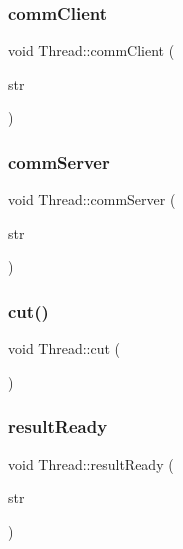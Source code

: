 \mbox{\label{class_thread_a263c49745ef39e51461339f482da6465}} 
\subsubsection{\texorpdfstring{comm\+Client}{commClient}}
{\footnotesize\ttfamily void Thread\+::comm\+Client (\begin{DoxyParamCaption}\item[{Q\+String}]{str }\end{DoxyParamCaption})\hspace{0.3cm}{\ttfamily [signal]}}

\mbox{\label{class_thread_a3a648f8e1ca34baf6a9c9ce98d51f498}} 
\subsubsection{\texorpdfstring{comm\+Server}{commServer}}
{\footnotesize\ttfamily void Thread\+::comm\+Server (\begin{DoxyParamCaption}\item[{Q\+String}]{str }\end{DoxyParamCaption})\hspace{0.3cm}{\ttfamily [signal]}}

\mbox{\label{class_thread_a01a6a634b4b993bf5ee53ccba4ad951d}} 
\subsubsection{\texorpdfstring{cut()}{cut()}}
{\footnotesize\ttfamily void Thread\+::cut (\begin{DoxyParamCaption}{ }\end{DoxyParamCaption})}

\mbox{\label{class_thread_aa850562d414991f4b235d23623902ce6}} 
\subsubsection{\texorpdfstring{result\+Ready}{resultReady}}
{\footnotesize\ttfamily void Thread\+::result\+Ready (\begin{DoxyParamCaption}\item[{Q\+String}]{str }\end{DoxyParamCaption})\hspace{0.3cm}{\ttfamily [signal]}}

